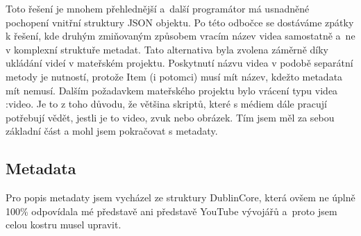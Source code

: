 \par Toto řešení je mnohem přehlednější a~další programátor má usnadněné pochopení vnitřní struktury JSON objektu. Po této odbočce se dostáváme zpátky k řešení, kde druhým zmiňovaným způsobem vracím název videa samostatně a~ne v komplexní struktuře metadat. Tato alternativa byla zvolena záměrně díky ukládání videí v mateřském projektu. Poskytnutí názvu videa v podobě separátní metody je nutností, protože Item (i potomci) musí mít název, kdežto metadata mít nemusí. Dalším požadavkem mateřského projektu bylo vrácení typu videa :video. Je to z toho důvodu, že většina skriptů, které s médiem dále pracují potřebují vědět, jestli je to video, zvuk nebo obrázek. Tím jsem měl za sebou základní část a mohl jsem pokračovat s metadaty.

\subsection{Metadata}

\par Pro popis metadaty jsem vycházel ze struktury DublinCore, která ovšem ne úplně 100\% odpovídala mé představě ani představě YouTube vývojářů a~proto jsem celou kostru musel upravit. 

